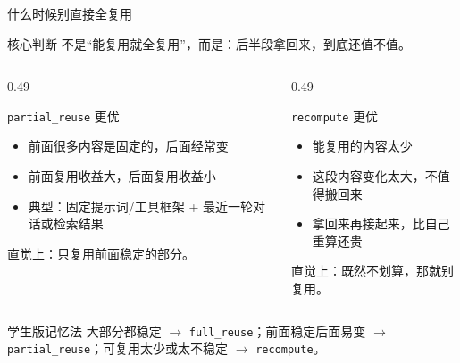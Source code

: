\documentclass[aspectratio=169,UTF8,11pt]{ctexbeamer}
\begin{document}
\begin{frame}{什么时候别直接全复用}
  \begin{block}{核心判断}
    不是“能复用就全复用”，而是：\alert{后半段拿回来，到底还值不值。}
  \end{block}

  \begin{columns}[T]
    \begin{column}{0.49\textwidth}
      \scriptsize
      \begin{block}{\texttt{partial\_reuse} 更优}
        \begin{itemize}
          \item 前面很多内容是固定的，后面经常变
          \item 前面复用收益大，后面复用收益小
          \item 典型：固定提示词/工具框架 + 最近一轮对话或检索结果
        \end{itemize}
      \end{block}
      直觉上：\alert{只复用前面稳定的部分。}
    \end{column}
    \begin{column}{0.49\textwidth}
      \scriptsize
      \begin{block}{\texttt{recompute} 更优}
        \begin{itemize}
          \item 能复用的内容太少
          \item 这段内容变化太大，不值得搬回来
          \item 拿回来再接起来，比自己重算还贵
        \end{itemize}
      \end{block}
      直觉上：\alert{既然不划算，那就别复用。}
    \end{column}
  \end{columns}

  \vspace{0.3em}
  \begin{block}{学生版记忆法}
    大部分都稳定 $\rightarrow$ \texttt{full\_reuse}；前面稳定后面易变 $\rightarrow$ \texttt{partial\_reuse}；可复用太少或太不稳定 $\rightarrow$ \texttt{recompute}。
  \end{block}
\end{frame}
\end{document}
